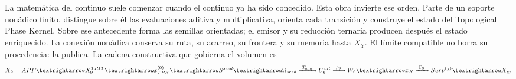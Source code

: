 La matemática del continuo suele comenzar cuando el continuo ya ha sido
concedido. Esta obra invierte ese orden. Parte de un soporte nonádico finito,
distingue sobre él las evaluaciones aditiva y multiplicativa, orienta cada
transición y construye el estado del Topological Phase Kernel. Sobre ese
antecedente forma las semillas orientadas; el emisor y su reducción ternaria
producen después el estado enriquecido. La conexión nonádica conserva su
ruta, su acarreo, su frontera y su memoria hasta \(X_\chi\). El límite
compatible no borra su procedencia: la publica. La cadena constructiva que
gobierna el volumen es
\begin{equation}\label{eq:front-cadena-causal-completa}
 X_9=\mathrm{APP}\longrightarrow X_9^{\rm TRIT}
 \longrightarrow x_{\rm TPK}^{(0)}
 \longrightarrow S^{\rm seed}
 \longrightarrow \Omega_{\rm seed}
 \xrightarrow{\ T_{\min}\ }U_6^{\rm cat}
 \xrightarrow{\ \rho_3\ }W_6
 \longrightarrow \widehat x_K
 \xrightarrow{\ \Gamma_9\ }
 \operatorname{Surv}^{(\chi)}
 \longrightarrow X_\chi .
\end{equation}
